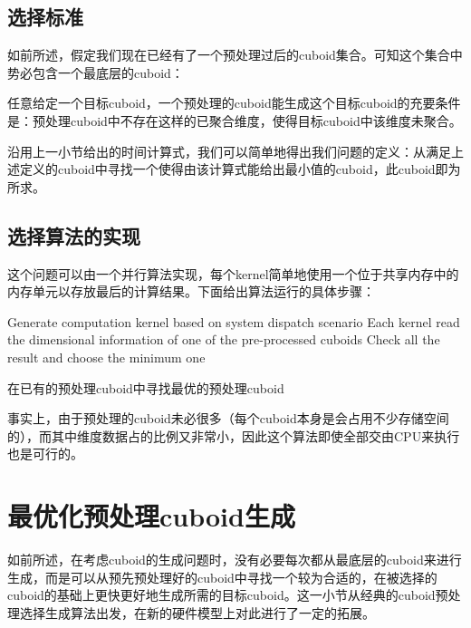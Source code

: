 \subsection{选择标准}
如前所述，假定我们现在已经有了一个预处理过后的cuboid集合。可知这个集合中势必包含一个最底层的cuboid：

\begin{definition}
任意给定一个目标cuboid，一个预处理的cuboid能生成这个目标cuboid的充要条件是：预处理cuboid中不存在这样的已聚合维度，使得目标cuboid中该维度未聚合。
\end{definition}

沿用上一小节给出的时间计算式，我们可以简单地得出我们问题的定义：从满足上述定义的cuboid中寻找一个使得由该计算式能给出最小值的cuboid，此cuboid即为所求。

\subsection{选择算法的实现}
这个问题可以由一个并行算法实现，每个kernel简单地使用一个位于共享内存中的内存单元以存放最后的计算结果。下面给出算法运行的具体步骤：

\begin{algorithm}[htbp]
\SetAlgoLined
{}
Generate computation kernel based on system dispatch scenario\;
Each kernel read the dimensional information of one of the pre-processed cuboids\;
Check all the result and choose the minimum one\;
\caption{在已有的预处理cuboid中寻找最优的预处理cuboid}
\label{algo:algorithm3}
\end{algorithm}

事实上，由于预处理的cuboid未必很多（每个cuboid本身是会占用不少存储空间的），而其中维度数据占的比例又非常小，因此这个算法即使全部交由CPU来执行也是可行的。

\section{最优化预处理cuboid生成}
如前所述，在考虑cuboid的生成问题时，没有必要每次都从最底层的cuboid来进行生成，而是可以从预先预处理好的cuboid中寻找一个较为合适的，在被选择的cuboid的基础上更快更好地生成所需的目标cuboid。这一小节从经典的cuboid预处理选择生成算法出发，在新的硬件模型上对此进行了一定的拓展。

